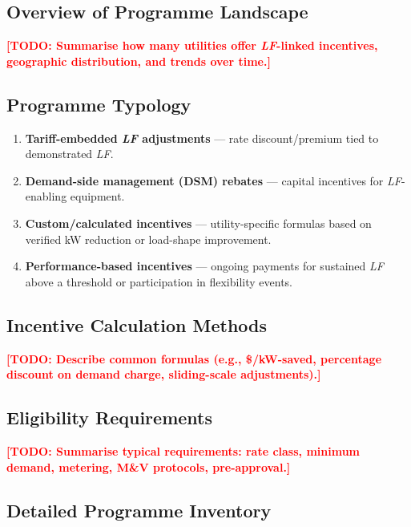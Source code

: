 \documentclass[12pt, a4paper, twocolumn]{article}
\newcommand{\LF}{\textit{LF}}
\newcommand{\TODO}[1]{\textcolor{red}{\textbf{[TODO: #1]}}}
\begin{document}
\subsection{Overview of Programme Landscape}
\TODO{Summarise how many utilities offer \LF{}-linked incentives, geographic distribution, and trends over time.}

\subsection{Programme Typology}
\begin{enumerate}[nosep]
  \item \textbf{Tariff-embedded \LF{} adjustments} — rate discount/premium tied to demonstrated \LF{}.
  \item \textbf{Demand-side management (DSM) rebates} — capital incentives for \LF{}-enabling equipment.
  \item \textbf{Custom/calculated incentives} — utility-specific formulas based on verified kW reduction or load-shape improvement.
  \item \textbf{Performance-based incentives} — ongoing payments for sustained \LF{} above a threshold or participation in flexibility events.
\end{enumerate}

\subsection{Incentive Calculation Methods}
\TODO{Describe common formulas (e.g., \$/kW-saved, percentage discount on demand charge, sliding-scale adjustments).}

\subsection{Eligibility Requirements}
\TODO{Summarise typical requirements: rate class, minimum demand, metering, M\&V protocols, pre-approval.}

\subsection{Detailed Programme Inventory}
\end{document}
